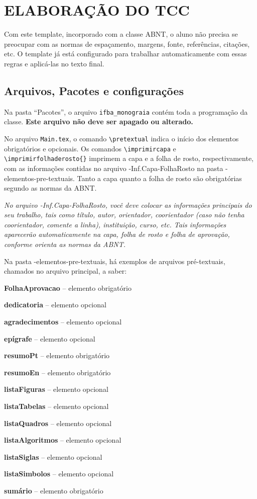 \chapter{ELABORAÇÃO DO TCC}
Com este template, incorporado com a classe ABNT, o aluno não precisa se preocupar com as normas de espaçamento, margens, fonte, referências, citações, etc. O template já está configurado para trabalhar automaticamente com essas regras e aplicá-las no texto final.
\section{Arquivos, Pacotes e configurações}
Na pasta ``Pacotes'', o arquivo {\ttfamily \verb+ifba_monograia+} contém toda a programação da classe. \textbf{Este arquivo não deve ser apagado ou alterado.}

No arquivo \verb+Main.tex+, o comando \verb#\pretextual# indica o início  dos elementos obrigatórios e opcionais. Os comandos \verb#\imprimircapa# e \verb#\imprimirfolhaderosto{}# imprimem a capa e a folha de rosto, respectivamente, com as informações contidas no arquivo {-Inf.Capa-FolhaRosto} na pasta {-elementos-pre-textuais}. Tanto a capa quanto a folha de rosto são obrigatórias segundo as normas da ABNT.

\textit{No arquivo \textit{{-Inf.Capa-FolhaRosto}}, você deve colocar as informações principais do seu trabalho, tais como título, autor, orientador, coorientador (caso não tenha coorientador, comente a linha), instituição, curso, etc. Tais informações aparecerão automaticamente na capa, folha de rosto e folha de aprovação, conforme orienta as normas da ABNT.}

Na pasta {-elementos-pre-textuais}, há exemplos de arquivos pré-textuais, chamados no arquivo principal, a saber:

\begin{alineas}
\item \textbf{FolhaAprovacao} -- elemento obrigatório
\item \textbf{dedicatoria} -- elemento opcional
\item \textbf{agradecimentos} -- elemento opcional
\item \textbf{epígrafe} -- elemento opcional
\item \textbf{resumoPt} -- elemento obrigatório
\item \textbf{resumoEn} -- elemento obrigatório
\item \textbf{listaFiguras} -- elemento opcional
\item \textbf{listaTabelas} -- elemento opcional
\item \textbf{listaQuadros} -- elemento opcional
\item \textbf{listaAlgoritmos} -- elemento opcional
\item \textbf{listaSiglas} -- elemento opcional
\item \textbf{listaSimbolos} -- elemento opcional
\item \textbf{sumário} -- elemento obrigatório
\end{alineas}

